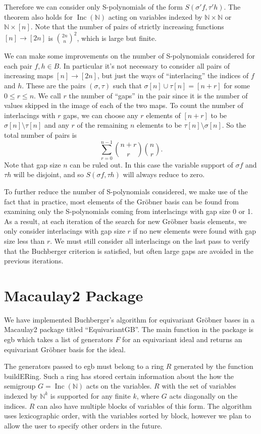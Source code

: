 \documentclass{amsart}
\theoremstyle{definition}
\theoremstyle{remark}
\numberwithin{equation}{section}
\newcommand{\B}[1]{\mathbb #1}
\newcommand{\<}{\langle}
\renewcommand{\>}{\rangle}
\newcommand{\Inc}{\operatorname{Inc}(\B N)}
\begin{document}
Therefore we can consider only S-polynomials of the form $S(\sigma' f,\tau' h)$.  The theorem also holds for $\Inc$ acting on variables indexed by $\B N \times \B N$ or $\B N \times [n]$.  Note that the number of pairs of strictly increasing functions $[n] \to [2n]$ is $\binom{2n}{n}^2$, which is large but finite.

We can make some improvements on the number of S-polynomials considered for each pair $f,h \in B$.  In particular it's not necessary to consider all pairs of increasing maps $[n] \to [2n]$, but just the ways of ``interlacing'' the indices of $f$ and $h$.  These are the pairs $(\sigma,\tau)$ such that $\sigma[n] \cup \tau[n] = [n+r]$ for some $0 \leq r \leq n$.  We call $r$ the number of ``gaps'' in the pair since it is the number of values skipped in the image of each of the two maps.  To count the number of interlacings with $r$ gaps, we can choose any $r$ elements of $[n+r]$ to be $\sigma[n] \setminus \tau[n]$ and any $r$ of the remaining $n$ elements to be $\tau[n] \setminus \sigma[n]$.  So the total number of pairs is
 \[ \sum_{r=0}^{n-1} \binom{n+r}{r}\binom{n}{r}. \]
Note that gap size $n$ can be ruled out.  In this case the variable support of $\sigma f$ and $\tau h$ will be disjoint, and so $S(\sigma f, \tau h)$ will always reduce to zero.

To further reduce the number of S-polynomials considered, we make use of the fact that in practice, most elements of the Gr\"obner basis can be found from examining only the S-polynomials coming from interlacings with gap size 0 or 1.  As a result, at each iteration of the search for new Gr\"obner basis elements, we only consider interlacings with gap size $r$ if no new elements were found with gap size less than $r$.  We must still consider all interlacings on the last pass to verify that the Buchberger criterion is satisfied, but often large gaps are avoided in the previous iterations.

\section{Macaulay2 Package}
We have implemented Buchberger's algorithm for equivariant Gr\"obner bases in a Macaulay2 package titled ``EquivariantGB''.  The main function in the package is {\ttfamily egb} which takes a list of generators $F$ for an equivariant ideal and returns an equivariant Gr\"obner basis for the ideal.

The generators passed to {\ttfamily egb} must belong to a ring $R$ generated by the function {\ttfamily buildERing}.  Such a ring has stored certain information about the how the semigroup $G = \Inc$ acts on the variables.  $R$ with the set of variables indexed by $\B N^k$ is supported for any finite $k$, where $G$ acts diagonally on the indices.   $R$ can also have multiple blocks of variables of this form.  The algorithm uses lexicographic order, with the variables sorted by block, however we plan to allow the user to specify other orders in the future.
\end{document}
